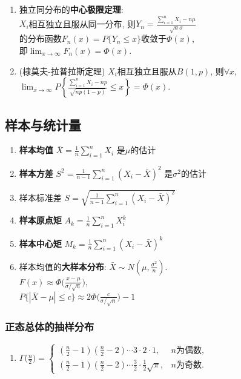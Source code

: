 \documentclass[10pt,a4paper,nofonts]{ctexart}
\newcommand{\D}{\displaystyle}
\renewcommand{\le}{\leqslant}
\begin{document}
\begin{multicols}{2}
\begin{enumerate}
\item 独立同分布的{\bf 中心极限定理}: \\$X_i$相互独立且服从同一分布, 则$Y_n=\D\frac{\sum_{i=1}^{n}X_i-n\mu}{\sqrt{n}{\sigma}}$\\的分布函数$F_n(x)=P\{Y_n\le x\}$收敛于$\varPhi(x)$,\\ 即$\lim_{x\to\infty}F_n(x)=\varPhi(x).$

\item (棣莫夫-拉普拉斯定理) $X_i$相互独立且服从$B(1,p)$, 则$\forall x$, $\D\lim_{x\to\infty}P\left\{\frac{\sum_{i=1}^{n}X_i-np}{\sqrt{np(1-p)}}\le x\right\}=\varPhi(x).$

\end{enumerate}

\subsection{样本与统计量}

\begin{enumerate}
\item {\bf 样本均值} $\bar{X}=\frac{1}{n}\sum_{i=1}^{n}X_i$ 是$\mu$的估计
\item {\bf 样本方差} $S^2=\frac{1}{n-1}\sum_{i=1}^{n}(X_i-\bar{X})^2$ 是$\sigma^2$的估计
\item 样本标准差 $S=\sqrt{\frac{1}{n-1}\sum_{i=1}^{n}(X_i-\bar{X})^2}$
\item {\bf 样本原点矩} $A_k=\frac{1}{n}\sum_{i=1}^{n}X_i^k$
\item {\bf 样本中心矩} $M_k=\frac{1}{n}\sum_{i=1}^{n}(X_i-\bar{X})^k$
\item 样本均值的{\bf 大样本分布}: $\D\bar{X}\sim N(\mu,\frac{\sigma^2}{n})$.\\
$\D F(x)\approx\varPhi\Big(\frac{x-\mu}{\sigma/\sqrt{n}}\Big)$,\\
$\D P\{|\bar{X}-\mu|\le c\}\approx 2\varPhi\Big(\frac{c}{\sigma/\sqrt{n}}\Big)-1$

\end{enumerate}

\subsubsection*{正态总体的抽样分布}

\begin{enumerate}

\item $\D\Gamma\Big(\frac{n}{2}\Big)=\left\{\begin{array}{cl}
(\frac{n}{2}-1)(\frac{n}{2}-2)\cdots3\cdot2\cdot1, & \text{$n$为偶数},\\
(\frac{n}{2}-1)(\frac{n}{2}-2)\cdots\frac{3}{2}\cdot\frac{1}{2}\sqrt{\pi}, & \text{$n$为奇数}.
\end{array}\right.$


\end{enumerate}
\end{multicols}
\end{document}
